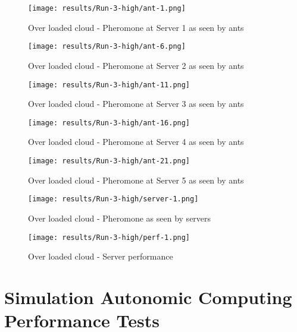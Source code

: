 \begin{figure}
	\centering
		\texttt{[image: results/Run-3-high/ant-1.png]}
	\caption{Over loaded cloud - Pheromone at Server 1 as seen by ants}
	\label{fig:3serv-ant1-high}
\end{figure}

\begin{figure}
	\centering
		\texttt{[image: results/Run-3-high/ant-6.png]}
	\caption{Over loaded cloud - Pheromone at Server 2 as seen by ants}
	\label{fig:3serv-ant6-high}
\end{figure}

\begin{figure}
	\centering
		\texttt{[image: results/Run-3-high/ant-11.png]}
	\caption{Over loaded cloud - Pheromone at Server 3 as seen by ants}
	\label{fig:3serv-ant11-high}
\end{figure}

\begin{figure}
	\centering
		\texttt{[image: results/Run-3-high/ant-16.png]}
	\caption{Over loaded cloud - Pheromone at Server 4 as seen by ants}
	\label{fig:3serv-ant16-high}
\end{figure}

\begin{figure}
	\centering
		\texttt{[image: results/Run-3-high/ant-21.png]}
	\caption{Over loaded cloud - Pheromone at Server 5 as seen by ants}
	\label{fig:3serv-ant21-high}
\end{figure}

\begin{figure}
	\centering
		\texttt{[image: results/Run-3-high/server-1.png]}
	\caption{Over loaded cloud - Pheromone as seen by servers}
	\label{fig:3serv-pher-high}
\end{figure}

\begin{figure}
	\centering
		\texttt{[image: results/Run-3-high/perf-1.png]}
	\caption{Over loaded cloud - Server performance}
	\label{fig:3serv-perf-high}
\end{figure}

\section{Simulation Autonomic Computing Performance Tests}

